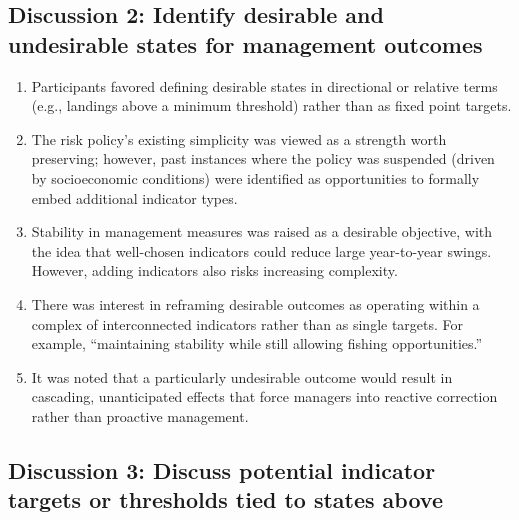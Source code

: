 \documentclass[
]{article}
\providecommand{\tightlist}{%
  \setlength{\itemsep}{0pt}\setlength{\parskip}{0pt}}
\begin{document}
\subsection{Discussion 2: Identify desirable and undesirable states for management outcomes}\label{discussion-2-identify-desirable-and-undesirable-states-for-management-outcomes}

\begin{enumerate}
\def\labelenumi{\arabic{enumi}.}
\tightlist
\item
  Participants favored defining desirable states in directional or relative terms (e.g., landings above a minimum threshold) rather than as fixed point targets.\\
\item
  The risk policy's existing simplicity was viewed as a strength worth preserving; however, past instances where the policy was suspended (driven by socioeconomic conditions) were identified as opportunities to formally embed additional indicator types.\\
\item
  Stability in management measures was raised as a desirable objective, with the idea that well-chosen indicators could reduce large year-to-year swings. However, adding indicators also risks increasing complexity.\\
\item
  There was interest in reframing desirable outcomes as operating within a complex of interconnected indicators rather than as single targets. For example, ``maintaining stability while still allowing fishing opportunities.''\\
\item
  It was noted that a particularly undesirable outcome would result in cascading, unanticipated effects that force managers into reactive correction rather than proactive management.
\end{enumerate}

\subsection{Discussion 3: Discuss potential indicator targets or thresholds tied to states above}\label{discussion-3-discuss-potential-indicator-targets-or-thresholds-tied-to-states-above}
\end{document}

